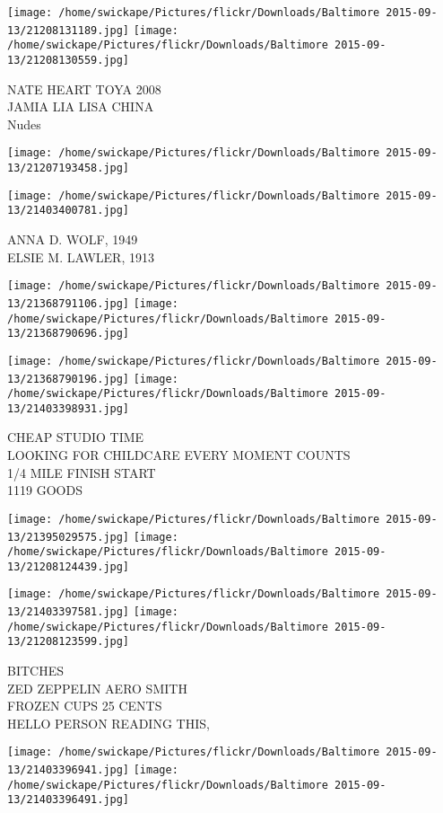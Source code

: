 \documentclass[10pt,letterpaper]{article}
\begin{document}
\vspace{0.25in}
\texttt{[image: /home/swickape/Pictures/flickr/Downloads/Baltimore 2015-09-13/21208131189.jpg]}
\texttt{[image: /home/swickape/Pictures/flickr/Downloads/Baltimore 2015-09-13/21208130559.jpg]}

NATE HEART TOYA 2008\\
JAMIA LIA LISA CHINA\\
Nudes
\pagebreak

\texttt{[image: /home/swickape/Pictures/flickr/Downloads/Baltimore 2015-09-13/21207193458.jpg]}

\vspace{0.25in}
\texttt{[image: /home/swickape/Pictures/flickr/Downloads/Baltimore 2015-09-13/21403400781.jpg]}

ANNA D. WOLF, 1949\\
ELSIE M. LAWLER, 1913
\pagebreak

\texttt{[image: /home/swickape/Pictures/flickr/Downloads/Baltimore 2015-09-13/21368791106.jpg]}
\texttt{[image: /home/swickape/Pictures/flickr/Downloads/Baltimore 2015-09-13/21368790696.jpg]}

\texttt{[image: /home/swickape/Pictures/flickr/Downloads/Baltimore 2015-09-13/21368790196.jpg]}
\texttt{[image: /home/swickape/Pictures/flickr/Downloads/Baltimore 2015-09-13/21403398931.jpg]}

CHEAP STUDIO TIME\\
LOOKING FOR CHILDCARE EVERY MOMENT COUNTS\\
1/4 MILE FINISH START\\
1119 GOODS
\pagebreak

\texttt{[image: /home/swickape/Pictures/flickr/Downloads/Baltimore 2015-09-13/21395029575.jpg]}
\texttt{[image: /home/swickape/Pictures/flickr/Downloads/Baltimore 2015-09-13/21208124439.jpg]}

\texttt{[image: /home/swickape/Pictures/flickr/Downloads/Baltimore 2015-09-13/21403397581.jpg]}
\texttt{[image: /home/swickape/Pictures/flickr/Downloads/Baltimore 2015-09-13/21208123599.jpg]}

BITCHES\\
ZED ZEPPELIN AERO SMITH\\
FROZEN CUPS 25 CENTS\\
HELLO PERSON READING THIS,
\pagebreak

\texttt{[image: /home/swickape/Pictures/flickr/Downloads/Baltimore 2015-09-13/21403396941.jpg]}
\texttt{[image: /home/swickape/Pictures/flickr/Downloads/Baltimore 2015-09-13/21403396491.jpg]}
\end{document}

